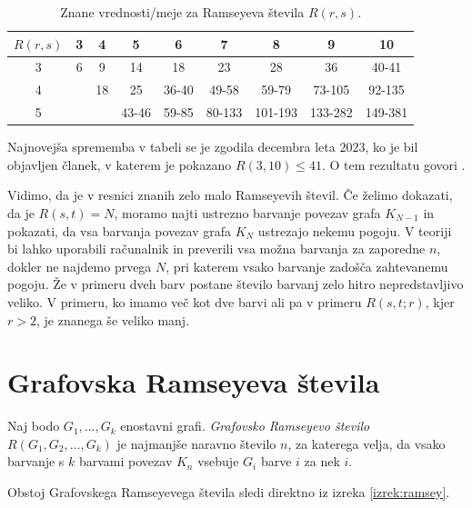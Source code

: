 \documentclass[twoside,11pt]{article}
\begin{document}
\begin{table}[h!]
    \centering
    \begin{tabular}{|c||c|c|c|c|c|c|c|c|}\hline
    $R(r,s)$ & 3 & 4  & 5     & 6     & 7     & 8     & 9       & 10     \\\hline \hline
    3 & 6 & 9  & 14    & 18    & 23    & 28    & 36      & 40-41  \\\hline
    4 &   & 18 & 25    & 36-40 & 49-58 & 59-79 & 73-105 & 92-135 \\\hline
    5 &   &    & 43-46 & 59-85 & 80-133 & 101-193 & 133-282 & 149-381\\\hline
    \end{tabular}
    \caption{Znane vrednosti/meje za Ramseyeva števila $R(r, s)$.}
    \label{tab:meje}
\end{table}
Najnovejša sprememba v tabeli se je zgodila decembra leta $2023$, ko je bil objavljen 
članek, v katerem je pokazano $R(3, 10) \le 41$. 
O tem rezultatu govori \cite{r41}.

Vidimo, da je v resnici znanih zelo malo Ramseyevih števil. Če želimo dokazati, 
da je $R(s, t) = N$, moramo najti ustrezno barvanje povezav grafa $K_{N-1}$ in pokazati, da 
vsa barvanja povezav grafa $K_{N}$ ustrezajo nekemu pogoju. V teoriji bi lahko uporabili računalnik 
in preverili vsa možna barvanja za zaporedne $n$, dokler ne najdemo prvega $N$, pri katerem vsako 
barvanje zadošča zahtevanemu pogoju. Že v primeru dveh barv postane število barvanj zelo hitro 
nepredstavljivo veliko. V primeru, ko imamo več kot dve barvi ali pa v primeru $R(s, t; r)$, kjer $r > 2$, je znanega še
veliko manj.

\section{Grafovska Ramseyeva števila}

\begin{definicija}
    Naj bodo $G_1, \dots, G_k$ enostavni grafi. \emph{Grafovsko Ramseyevo število}
    $R(G_1, G_2, \dots, G_k)$ je najmanjše naravno število $n$, za katerega velja, da 
    vsako barvanje s $k$ barvami povezav $K_n$ vsebuje $G_i$ barve $i$ za nek $i$. 
\end{definicija}

Obstoj Grafovskega Ramseyevega števila sledi direktno iz izreka \ref{izrek:ramsey}.
\end{document}
